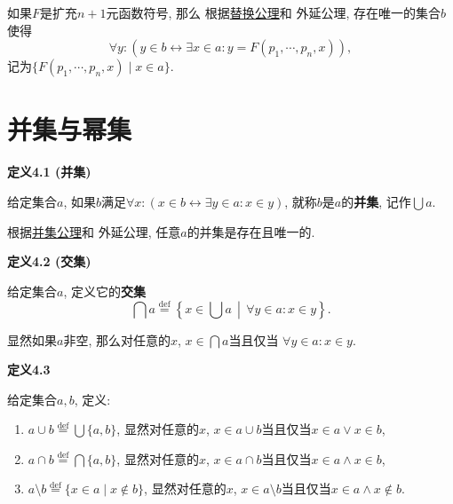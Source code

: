 如果$F$是扩充$n+1$元函数符号, 那么
根据\href{../01 ZFC 公理/01 ZFC 公理#nameddest=sec:替换公理模式}{替换公理}和
外延公理, 存在唯一的集合$b$使得
\[
    \forall y:(y\in b\leftrightarrow\exists x\in a:y=F(p_1,\cdots,p_n,x)),
\]
记为$\{F(p_1,\cdots,p_n,x)\mid x\in a\}$.





\vspace{20pt}

\section{并集与幂集}

\hypertarget{sec:定义4.1}{}
\noindent\textbf{定义4.1 (并集)}

给定集合$a$, 如果$b$满足$\forall x:(x\in b\leftrightarrow\exists y\in a:x\in y)$,
就称$b$是$a$的\textbf{并集}, 记作$\displaystyle\bigcup a$.

根据\href{../01 ZFC 公理/01 ZFC 公理#nameddest=sec:并集公理}{并集公理}和
外延公理, 任意$a$的并集是存在且唯一的.

\vspace{10pt}

\hypertarget{sec:定义4.2}{}
\noindent\textbf{定义4.2 (交集)}

给定集合$a$, 定义它的\textbf{交集}
\[
    \bigcap a\overset{\mathrm{def}}{=}\left\{x\in\bigcup a\,\middle\vert\,
    \forall y\in a:x\in y\right\}.
\]

\vspace{10pt}

显然如果$a$非空, 那么对任意的$x$, $\displaystyle x\in\bigcap a$当且仅当
$\forall y\in a:x\in y$.

\vspace{10pt}

\hypertarget{sec:定义4.3}{}
\noindent\textbf{定义4.3}

给定集合$a,b$, 定义:
\begin{enumerate}
    \item $\displaystyle a\cup b\overset{\mathrm{def}}{=}\bigcup\{a,b\}$,
    显然对任意的$x$, $x\in a\cup b$当且仅当$x\in a\lor x\in b$,
    \item $\displaystyle a\cap b\overset{\mathrm{def}}{=}\bigcap\{a,b\}$,
    显然对任意的$x$, $x\in a\cap b$当且仅当$x\in a\land x\in b$,
    \item $\displaystyle a\setminus b\overset{\mathrm{def}}{=}
    \{x\in a\mid x\notin b\}$,
    显然对任意的$x$, $x\in a\setminus b$当且仅当$x\in a\land x\notin b$.
\end{enumerate}

